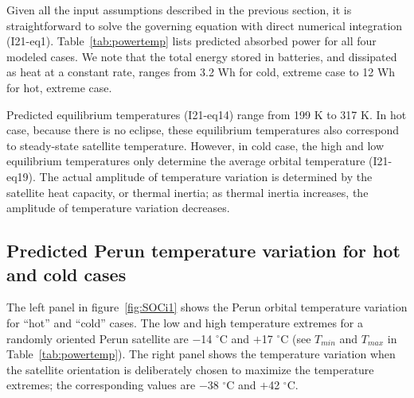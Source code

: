 \documentclass[]{aastex62}
\begin{document}
Given all the input assumptions described in the previous section, it is straightforward to solve the
governing equation with direct numerical integration (I21-eq1). Table~\ref{tab:powertemp} lists predicted 
absorbed power for all four modeled cases.  We note that the total energy stored in batteries, and 
dissipated as heat at a constant rate, ranges from 3.2 Wh for cold, extreme case to 12 Wh for hot, extreme
case. 

Predicted equilibrium temperatures (I21-eq14) range from 199 K to 317 K. In hot case, because there
is no eclipse, these equilibrium temperatures also correspond to steady-state satellite temperature.
However, in cold case, the high and low equilibrium temperatures only determine the average orbital
temperature (I21-eq19). The actual amplitude of temperature variation is determined by the satellite
heat capacity, or thermal inertia; as thermal inertia increases, the amplitude of temperature variation 
decreases. 

 
\subsection{Predicted Perun temperature variation for hot and cold cases} 


The left panel in figure~\ref{fig:SOCi1} shows the Perun orbital temperature variation  for ``hot''
and ``cold'' cases. The low and high temperature extremes for a randomly oriented Perun satellite 
are $-$14 $^\circ$C and $+$17 $^\circ$C (see $T_{min}$ and $T_{max}$ in Table~\ref{tab:powertemp}). 
The right panel shows the temperature variation when the satellite orientation is deliberately chosen 
to maximize the temperature extremes; the corresponding values are $-$38 $^\circ$C and $+$42 $^\circ$C.  
 
\end{document}

